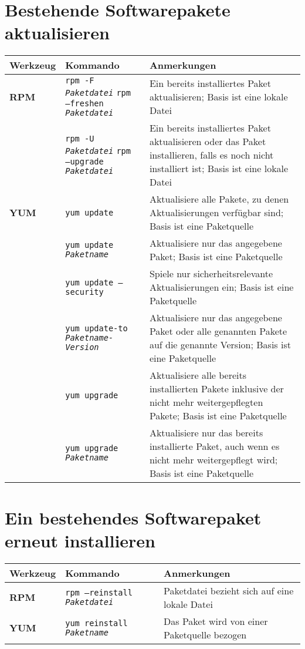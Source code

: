 \documentclass[10pt,a4paper]{article}
\begin{document}
\section{Bestehende Softwarepakete aktualisieren}
\begin{tabular}{ p{3.5cm} p{9cm} p{11cm}}
  \hline
  \rowcolor{Gray}
  \textbf{Werkzeug} & \textbf{Kommando} & \textbf{Anmerkungen} \\
  \hline 
  \textbf{RPM} & \texttt{rpm -F \textit{Paketdatei}} \newline \texttt{rpm --freshen \textit{Paketdatei}} & Ein bereits installiertes Paket aktualisieren; Basis ist eine lokale Datei \\
  \rowcolor{Gray}
  & \texttt{rpm -U \textit{Paketdatei}} \newline \texttt{rpm --upgrade \textit{Paketdatei}} & Ein bereits installiertes Paket aktualisieren oder das Paket installieren, falls es noch nicht installiert ist; Basis ist eine lokale Datei \\
  \textbf{YUM} & \texttt{yum update} & Aktualisiere alle Pakete, zu denen Aktualisierungen verfügbar sind; Basis ist eine Paketquelle \\
  \rowcolor{Gray}
  & \texttt{yum update \textit{Paketname}} & Aktualisiere nur das angegebene Paket; Basis ist eine Paketquelle \\  
  & \texttt{yum update --security} & Spiele nur sicherheitsrelevante Aktualisierungen ein; Basis ist eine Paketquelle \\  
  \rowcolor{Gray}
  & \texttt{yum update-to \textit{Paketname-Version}} & Aktualisiere nur das angegebene Paket oder alle genannten Pakete auf die genannte Version; Basis ist eine Paketquelle \\  
  & \texttt{yum upgrade} & Aktualisiere alle bereits installierten Pakete inklusive der nicht mehr weitergepflegten Pakete; Basis ist eine Paketquelle \\  
  \rowcolor{Gray}
  & \texttt{yum upgrade \textit{Paketname}} & Aktualisiere nur das bereits installierte Paket, auch wenn es nicht mehr weitergepflegt wird; Basis ist eine Paketquelle \\  
  \hline
\end{tabular}

\newpage

\cheatsheet

\section{Ein bestehendes Softwarepaket erneut installieren}
\begin{tabular}{ p{3.5cm} p{9cm} p{11cm}}
  \hline
  \rowcolor{Gray}
  \textbf{Werkzeug} & \textbf{Kommando} & \textbf{Anmerkungen} \\
  \hline 
  \textbf{RPM} & \texttt{rpm --reinstall \textit{Paketdatei}} & Paketdatei bezieht sich auf eine lokale Datei \\
  \rowcolor{Gray}
  \textbf{YUM} & \texttt{yum reinstall \textit{Paketname}} & Das Paket wird von einer Paketquelle bezogen \\
  \hline
\end{tabular}
\end{document}
